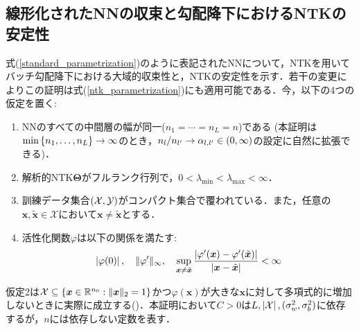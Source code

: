 \subsection{線形化されたNNの収束と勾配降下におけるNTKの安定性}
式(\ref{standard_parametrization})のように表記されたNNについて，NTKを用いてバッチ勾配降下における大域的収束性と，NTKの安定性を示す．若干の変更によりこの証明は式(\ref{ntk_parametrization})にも適用可能である．今，以下の4つの仮定を置く:
\begin{enumerate}
    \item NNのすべての中間層の幅が同一($n_1=\cdots=n_L=n$)である (本証明は$\min\left\{n_1,\ldots,n_L\right\} \rightarrow \infty$のとき，$n_l / n_{l'} \rightarrow \alpha_{l, l'} \in \left(0, \infty\right)$の設定に自然に拡張できる)．
    \item 解析的NTK$\bm{\Theta}$がフルランク行列で，$0 < \lambda_{\min} < \lambda_{\max} < \infty$．
    \item 訓練データ集合$\left(\mathcal{X}, \mathcal{Y}\right)$がコンパクト集合で覆われている．また，任意の$\bm{x}, \tilde{\bm{x}} \in \mathcal{X}$において$\bm{x} \neq \tilde{\bm{x}}$とする．
    \item 活性化関数$\varphi$は以下の関係を満たす:
    \begin{align}
        \label{act_func_lipschitz}
        \left|\varphi(0)\right|, \quad \|\varphi'\|_{\infty}, \quad \sup_{\bm{x} \neq \tilde{\bm{x}}} \dfrac{\left|\varphi'(\bm{x}) - \varphi'(\tilde{\bm{x}})\right|}{\left|\bm{x} - \tilde{\bm{x}}\right|} < \infty
    \end{align}
\end{enumerate}
仮定2は$\mathcal{X} \subseteq \left\{\bm{x} \in \mathbb{R}^{n_0}:\|\bm{x}\|_2 = 1\right\}$かつ$\varphi(\bm{x})$が大きな$\bm{x}$に対して多項式的に増加しないときに実際に成立する(\citealp{jacot2018neural})．本証明において$C>0$は$L, \left|\mathcal{X}\right|, (\sigma_w^2, \sigma_b^2)$に依存するが，$n$には依存しない定数を表す．

